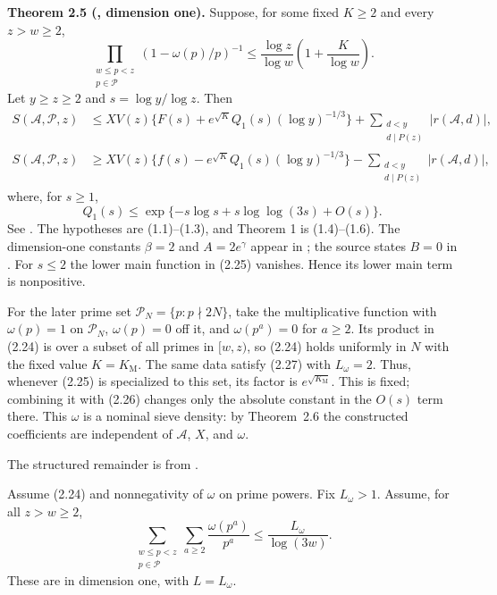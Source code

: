 \textbf{Theorem 2.5 (\cite[Theorem~1]{AA36}, dimension one).} Suppose, for some fixed $K\geq2$ and every $z>w\geq2$,
\[
 \prod_{\substack{w\leq p<z\\p\in\mathcal P}}
 (1-\omega(p)/p)^{-1}
 \leq\frac{\log z}{\log w}\left(1+\frac K{\log w}\right).
\tag{2.24}\label{p1:eq:2.24}
\]
Let $y\geq z\geq2$ and $s=\log y/\log z$. Then
\[
\begin{split}
 S(\mathcal A,\mathcal P,z)
 &\leq XV(z)\{F(s)+e^{\sqrt K}Q_1(s)(\log y)^{-1/3}\}
 +\sum_{\substack{d<y\\d\mid P(z)}}|r(\mathcal A,d)|,\\
 S(\mathcal A,\mathcal P,z)
 &\geq XV(z)\{f(s)-e^{\sqrt K}Q_1(s)(\log y)^{-1/3}\}
 -\sum_{\substack{d<y\\d\mid P(z)}}|r(\mathcal A,d)|,
\end{split}
\tag{2.25}\label{p1:eq:2.25}
\]
where, for $s\geq1$,
\[
 Q_1(s)\leq\exp\{-s\log s+s\log\log(3s)+O(s)\}.
\tag{2.26}\label{p1:eq:2.26}
\]
See \cite{AA36}. The hypotheses are (1.1)--(1.3), and Theorem 1 is (1.4)--(1.6). The dimension-one constants $\beta=2$ and $A=2e^\gamma$ appear in \cite[p.~176]{AA36}; the source states $B=0$ in \cite[p.~173]{AA36}. For $s\leq2$ the lower main function in (2.25) vanishes. Hence its lower main term is nonpositive.

For the later prime set $\mathcal P_N=\{p:p\nmid2N\}$, take the
multiplicative function with $\omega(p)=1$ on $\mathcal P_N$,
$\omega(p)=0$ off it, and $\omega(p^a)=0$ for $a\geq2$. Its product
in (2.24) is over a subset of all primes in $[w,z)$, so (2.24) holds
uniformly in $N$ with the fixed value $K=K_{\mathrm M}$. The same data
satisfy (2.27) with $L_\omega=2$. Thus, whenever (2.25) is specialized
to this set, its factor is $e^{\sqrt{K_{\mathrm M}}}$. This is fixed;
combining it with (2.26) changes only the absolute constant in the
$O(s)$ term there.
This $\omega$ is a nominal sieve density: by Theorem~2.6 the constructed
coefficients are independent of $\mathcal A$, $X$, and $\omega$.

The structured remainder is from \cite[Theorem~4]{AA37}.

Assume (2.24) and nonnegativity of $\omega$ on prime powers. Fix $L_\omega>1$. Assume, for all $z>w\geq2$,
\[
 \sum_{\substack{w\leq p<z\\p\in\mathcal P}}
       \sum_{a\geq2}\frac{\omega(p^a)}{p^a}
 \leq\frac{L_\omega}{\log(3w)}.
\tag{2.27}\label{p1:eq:2.27}
\]
These are \cite[(1)--(2)]{AA37} in dimension one, with $L=L_\omega$.

